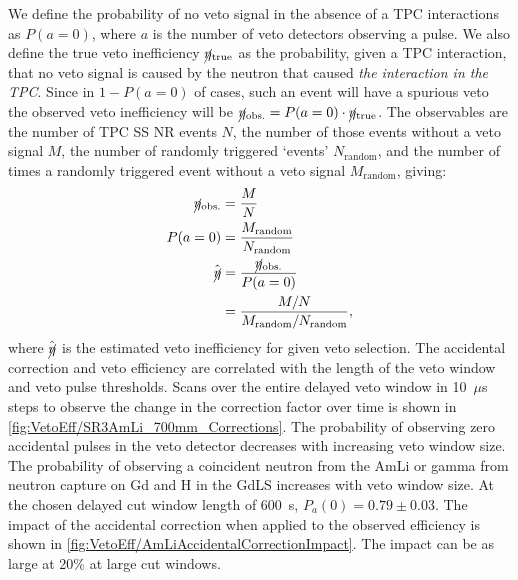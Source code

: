 We define the probability of no veto signal in the absence of a TPC interactions as $P(a=0)$, where $a$ is the number of veto detectors observing a pulse. We also define the true veto inefficiency $\cancel\eta_\text{true}$ as the probability, given a TPC interaction, that no veto signal is caused by the neutron that caused \emph{the interaction in the TPC}. Since in $1-P(a=0)$ of cases, such an event will have a spurious veto the observed veto inefficiency will be $\cancel\eta_\text{obs.}=P(a=0)\cdot\cancel\eta_\text{true}$. The observables are the number of TPC SS NR events $N$, the number of those events without a veto signal $M$, the number of randomly triggered `events' $N_\text{random}$, and the number of times a randomly triggered event without a veto signal $M_\text{random}$, giving:
\begin{align}
    \cancel\eta_\text{obs.}&=\frac{M}{N}\\
    P(a=0)&=\frac{M_\text{random}}{N_\text{random}}\\
    \hat{\cancel\eta}&=\frac{\cancel\eta_\text{obs.}}{P(a=0)}\\
    &=\frac{M/N}{M_\text{random}/N_\text{random}},
\end{align}
where $\hat{\cancel\eta}$ is the estimated veto inefficiency for given veto selection. The accidental correction and veto efficiency are correlated with the length of the veto window and veto pulse thresholds. Scans over the entire delayed veto window in 10~$\mu$s steps to observe the change in the correction factor over time is shown in \autoref{fig:VetoEff/SR3AmLi_700mm_Corrections}. The probability of observing zero accidental pulses in the veto detector decreases with increasing veto window size. The probability of observing a coincident neutron from the AmLi or gamma from neutron capture on Gd and H in the GdLS increases with veto window size. At the chosen delayed cut window length of 600~\textmu s, $P_a(0)=0.79\pm0.03$. 
The impact of the accidental correction when applied to the observed efficiency is shown in \autoref{fig:VetoEff/AmLiAccidentalCorrectionImpact}. The impact can be as large at 20\% at large cut windows.

